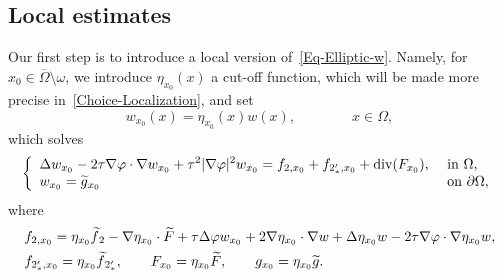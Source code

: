 \documentclass[10pt]{amsart}
\theoremstyle{definition}\newtheorem{defi}[theo]{Definition}\newtheorem{rema}[theo]{Remark}\newtheorem{exam}[theo]{Example}\newtheorem{exem}[theo]{Example}\newtheorem{nota}[theo]{Notation}
\newcommand*\ds{\displaystyle}
\renewcommand{\tilde}{\widetilde}
\renewcommand{\div}{\operatorname{div}}
\let\oldtilde\tilde
\renewcommand*{\tilde}[1]{\mathchoice{\widetilde{#1}}{\widetilde{#1}}{\oldtilde{#1}}{\oldtilde{#1}}}
\begin{document}
\subsection{Local estimates}

Our first step is to introduce a local version of~\eqref{Eq-Elliptic-w}. Namely, for $x_0 \in \overline\Omega\setminus \omega$, we introduce $\eta_{x_0}(x)$ a cut-off function, which will be made more precise in~\eqref{Choice-Localization}, and set
\begin{equation*}
w_{x_0}(x) = \eta_{x_0}(x) w(x), \qquad \qquad x \in \Omega,
\end{equation*}
which solves
\begin{equation}\label{Eq-Elliptic-w-x0}
\left\{
\begin{array}{ll}
\ds \Delta w_{x_0} - 2\tau \nabla \varphi \cdot \nabla w_{x_0} + \tau^2 |\nabla \varphi|^2 w_{x_0} = f_{2,x_0} + f_{2_*',x_0} + \div(F_{x_0}), & \text{ in } \Omega,
\\
\ds w_{x_0} = \tilde g_{x_0} & \text{ on } \partial \Omega,
\end{array}
\right.
\end{equation}
where
\begin{align*}
& f_{2,x_0} = \eta_{x_0} \tilde f_2 -\nabla \eta_{x_0} \cdot \tilde F + \tau \Delta \varphi w_{x_0} +2 \nabla \eta_{x_0} \cdot \nabla w + \Delta \eta_{x_0} w - 2 \tau \nabla \varphi \cdot \nabla \eta_{x_0} w,
\\
& f_{2_*',x_0} = \eta_{x_0} \tilde f_{2_*'},
\qquad F_{x_0} = \eta_{x_0} \tilde F,
\qquad g_{x_0} = \eta_{x_0} \tilde g.
\end{align*}
\end{document}
